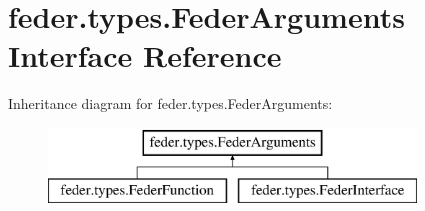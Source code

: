 \hypertarget{interfacefeder_1_1types_1_1FederArguments}{}\section{feder.\+types.\+Feder\+Arguments Interface Reference}
\label{interfacefeder_1_1types_1_1FederArguments}
Inheritance diagram for feder.\+types.\+Feder\+Arguments\+:\begin{figure}[H]
\begin{center}
\leavevmode
\includegraphics[height=2.000000cm]{interfacefeder_1_1types_1_1FederArguments}
\end{center}
\end{figure}
